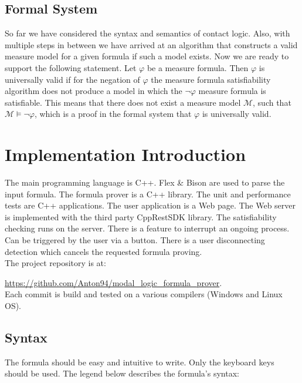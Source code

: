 \documentclass{article}
\begin{document}
	\subsection{Formal System} 
	So far we have considered the syntax and semantics of contact logic. Also, with multiple steps in between we have arrived at an algorithm that constructs a valid measure model for a given formula if such a model exists. 
	\newline
Now we are ready to support the following statement.
	\newline
	\newline
	Let $\varphi$ be a measure formula. Then $\varphi$ is universally valid if for the negation of $\varphi$ the measure formula satisfiability algorithm does not produce a model in which the $\neg \varphi$ measure formula is satisfiable.
	\newline
	This means that there does not exist a measure model $\mathcal{M}$, such that $\mathcal{M} \models \neg \varphi$, which is a proof in the formal system that $\varphi$ is universally valid.


	\newpage
	\section{Implementation Introduction}
	The main programming language is C++. Flex \& Bison are used to parse the input formula. The formula prover is a C++ library. The unit and performance tests are C++ applications.
	The user application is a Web page. The Web server is implemented with the third party CppRestSDK library. The satisfiability checking runs on the server. There is a feature to interrupt an ongoing process. Can be triggered by the user via a button. There is a user disconnecting detection which cancels the requested formula proving. \\
	The project repository is at:

	\url{https://github.com/Anton94/modal_logic_formula_prover}. \\
	Each commit is build and tested on a various compilers (Windows and Linux OS).
		
	\subsection{Syntax}
	The formula should be easy and intuitive to write. Only the keyboard keys should be used. The legend below describes the formula's syntax:
\end{document}
